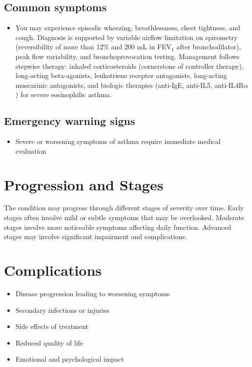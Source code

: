\subsection{Common symptoms}
\begin{itemize}[noitemsep]
  \item You may experience episodic wheezing, breathlessness, chest tightness, and cough. Diagnosis is supported by variable airflow limitation on spirometry (reversibility of more than 12\% and 200 mL in FEV$_1$ after bronchodilator), peak flow variability, and bronchoprovocation testing. Management follows stepwise therapy: inhaled corticosteroids (cornerstone of controller therapy), long-acting beta-agonists, leukotriene receptor antagonists, long-acting muscarinic antagonists, and biologic therapies (anti-IgE, anti-IL5, anti-IL4R$\alpha$) for severe eosinophilic asthma. 
  \end{itemize}

\subsection{Emergency warning signs}
\begin{itemize}[noitemsep]
  \item Severe or worsening symptoms of asthma require immediate medical evaluation
\end{itemize}
\section{Progression and Stages}
The condition may progress through different stages of severity over time. Early stages often involve mild or subtle symptoms that may be overlooked. Moderate stages involve more noticeable symptoms affecting daily function. Advanced stages may involve significant impairment and complications.
\section{Complications}
\begin{itemize}[noitemsep]
  \item Disease progression leading to worsening symptoms
  \item Secondary infections or injuries
  \item Side effects of treatment
  \item Reduced quality of life
  \item Emotional and psychological impact
\end{itemize}
